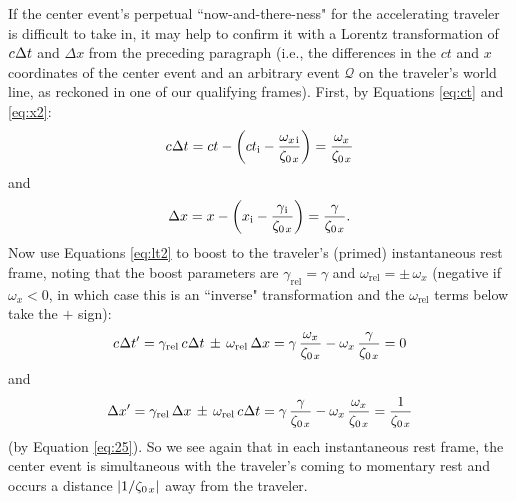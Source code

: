 \documentclass[12pt]{article}
\begin{document}
If the center event's perpetual ``now-and-there-ness" for the accelerating traveler is difficult to take in, it may help to confirm it with a Lorentz transformation of $c \mkern.5mu \Delta t $ and $\Delta x$ from the preceding paragraph (i.e., the differences in the $ct$ and $x$ coordinates of the center event and an arbitrary event $\mathcal{Q}$ on the traveler's world line, as reckoned in one of our qualifying frames). First, by Equations \ref{eq:ct} and \ref{eq:x2}:
\begin{equation*}
c \mkern.5mu \Delta t = ct - \left( ct_{\mathrm{i}} - \dfrac{\omega_{x \mkern2mu \textrm{i} }}{ \zeta_{0 \mkern2mu x}} \right) = \dfrac{\omega_x}{ \zeta_{0 \mkern2mu x}}
\end{equation*}
and
\begin{equation*}
\Delta x = x - \left( x_{\mathrm{i}} - \dfrac{\gamma_{\mkern1mu \textrm{i} }}{ \zeta_{0 \mkern2mu x}} \right) = \dfrac{\gamma}{ \zeta_{0 \mkern2mu x}} .
\end{equation*}
Now use Equations \ref{eq:lt2} to boost to the traveler's (primed) instantaneous rest frame, noting that the boost parameters are $\gamma_{\mathrm{rel}} = \gamma$ and $\omega_{\mathrm{rel}} = \pm \, \omega_x$ (negative if $\omega_x < 0$, in which case this is an ``inverse" transformation and the $\omega_{\textrm{rel}}$ terms below take the $+$ sign):
\begin{equation*}
c \mkern.5mu \Delta t^\prime = \gamma_{\textrm{rel}} \, c \mkern.5mu \Delta t \, \pm \, \omega_{\textrm{rel}} \, \Delta x = \gamma \, \dfrac{\omega_x}{ \zeta_{0 \mkern2mu x}} - \omega_x \, \dfrac{\gamma}{ \zeta_{0 \mkern2mu x}} = 0
\end{equation*}
and
\begin{equation*}
\Delta x^\prime = \gamma_{\textrm{rel}} \, \Delta x \, \pm \, \omega_{\textrm{rel}} \, c \mkern.5mu \Delta t = \gamma \, \dfrac{\gamma}{ \zeta_{0 \mkern2mu x}} - \omega_x \, \dfrac{\omega_x}{ \zeta_{0 \mkern2mu x}} = \dfrac{1}{ \zeta_{0 \mkern2mu x}}
\end{equation*}
(by Equation \ref{eq:25}). So we see again that in each instantaneous rest frame, the center event is simultaneous with the traveler's coming to momentary rest and occurs a distance $|1 / \zeta_{0 \mkern2mu x}|$ away from the traveler.
\end{document}
